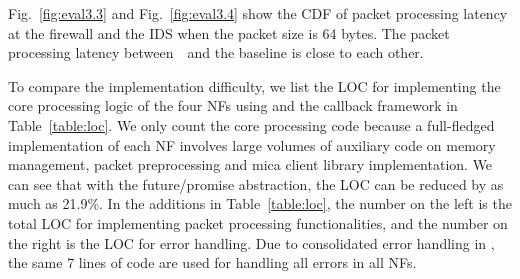 Fig.~\ref{fig:eval3.3} and Fig.~\ref{fig:eval3.4} show the CDF of packet processing latency at the firewall and the IDS when the packet size is 64 bytes. The packet processing latency between~\netstar~and the baseline is close to each other. %



\begin{table}[!h]
\centering
\caption{LOC Comparison: NFs from the StatelessNF Paper}
\label{table:loc}
\vspace{-3mm}
\end{table}

To compare the implementation difficulty, we list the LOC for implementing the core processing logic of the four NFs using \netstar and the callback framework in Table~\ref{table:loc}. We only count the core processing code because a full-fledged implementation of each NF involves large volumes of auxiliary code on memory management, packet preprocessing and mica client library implementation. %
We can see that with the future/promise abstraction, the LOC can be reduced by as much as 21.9\%.
In the additions in Table~\ref{table:loc}, the number on the left is the total LOC for implementing packet processing functionalities, and the number on the right is the LOC for error handling. Due to consolidated error handling in \netstar, the same 7 lines of code are used for handling all errors in all NFs. %

